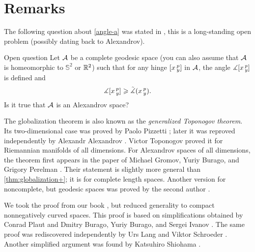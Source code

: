 \section{Remarks}

The following question about \ref{angle-a} was stated in \cite[footnote in 4.1.5]{burago-burago-ivanov}, this is a long-standing open problem (possibly dating back to Alexandrov).

\begin{thm}{Open question}\label{open:hinge-}
Let $\mathcal{A}$ be a complete geodesic space (you can also assume that $\mathcal{A}$ is homeomorphic to $\mathbb{S}^2$ or $\mathbb{R}^2$) 
such that for any hinge $[x\,{}^{p}_{y}]$ in $\mathcal{A}$, 
the angle $\measuredangle[x\,{}^{p}_{y}]$ is defined and 
\[\measuredangle[x\,{}^{p}_{y}]\geqslant\tilde\measuredangle(x\,{}^{p}_{y}).\]
Is it true that $\mathcal{A}$ is an Alexandrov space?
\end{thm}

The globalization theorem is also known as the \textit{generalized Toponogov theorem}.
Its two-dimensional case was proved by Paolo Pizzetti \cite{pizzetti};
later it was reproved independently by Alexandr Alexandrov \cite{alexandrov:devel}. %
Victor Toponogov \cite{toponogov-globalization+splitting} proved it for Riemannian manifolds of all dimensions.
For Alexandrov spaces of all dimensions, the theorem first appears in the paper of Michael Gromov, Yuriy Burago, and Grigory Perelman \cite{burago-gromov-perelman}.
Their statement is slightly more general than \ref{thm:globalization+}; it is for complete length spaces.
Another version for noncomplete, but geodesic spaces was proved by the second author \cite{petrunin:globalization}.


We took the proof from our book \cite{alexander-kapovitch-petrunin2024}, but reduced generality to compact nonnegatively curved spaces.
This proof is based on simplifications obtained by Conrad Plaut \cite{plaut:dimension} and Dmitry Burago, Yuriy Burago, and Sergei Ivanov \cite{burago-burago-ivanov}.
The same proof was rediscovered independently by Urs Lang and Viktor Schroeder \cite{lang-schroeder:globalization}.
Another simplified argument was found by Katsuhiro Shiohama \cite{shiohama}.




